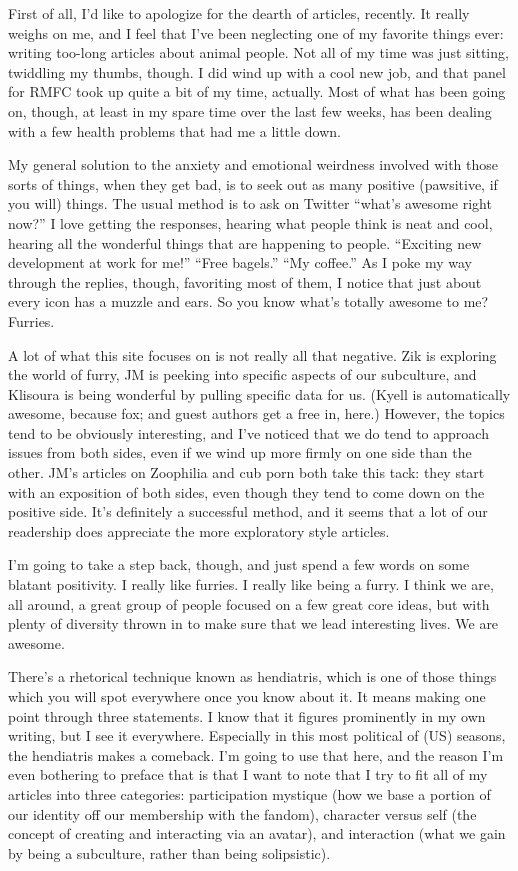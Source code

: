 
First of all, I'd like to apologize for the dearth of articles, recently. It really weighs on me, and I feel that I've been neglecting one of my favorite things ever: writing too-long articles about animal people.  Not all of my time was just sitting, twiddling my thumbs, though.  I did wind up with a cool new job, and that panel for RMFC took up quite a bit of my time, actually.  Most of what has been going on, though, at least in my spare time over the last few weeks, has been dealing with a few health problems that had me a little down.

My general solution to the anxiety and emotional weirdness involved with those sorts of things, when they get bad, is to seek out as many positive (pawsitive, if you will) things.  The usual method is to ask on Twitter ``what's awesome right now?''  I love getting the responses, hearing what people think is neat and cool, hearing all the wonderful things that are happening to people.  ``Exciting new development at work for me!''  ``Free bagels.''  ``My coffee.''  As I poke my way through the replies, though, favoriting most of them, I notice that just about every icon has a muzzle and ears.  So you know what's totally awesome to me? Furries.

A lot of what this site focuses on is not really all that negative.  Zik is exploring the world of furry, JM is peeking into specific aspects of our subculture, and Klisoura is being wonderful by pulling specific data for us. (Kyell is automatically awesome, because fox; and guest authors get a free in, here.)  However, the topics tend to be obviously interesting, and I've noticed that we do tend to approach issues from both sides, even if we wind up more firmly on one side than the other.  JM's articles on Zoophilia and cub porn both take this tack: they start with an  exposition of both sides, even though they tend to come down on the positive side.  It's definitely a successful method, and it seems that a lot of our readership does appreciate the more exploratory style articles.

I'm going to take a step back, though, and just spend a few words on some blatant positivity.  I really like furries.  I really like  being a furry.  I think we are, all around, a great group of people focused on a few great core ideas, but with plenty of diversity thrown in to make sure that we lead interesting lives.  We are awesome.

There's a rhetorical technique known as hendiatris, which is one of those things which you will spot everywhere once you know about it.  It means making one point through three statements.  I know that it figures prominently in my own writing, but I see it everywhere.  Especially in this most political of (US) seasons, the hendiatris makes a comeback.  I'm going to use that here, and the reason I'm even bothering to preface that is that I want to note that I try to fit all of my articles into three categories: participation mystique (how we base a portion of our identity off our membership with the fandom), character versus self (the concept of creating and interacting via an avatar), and interaction (what we gain by being a subculture, rather than being solipsistic).

